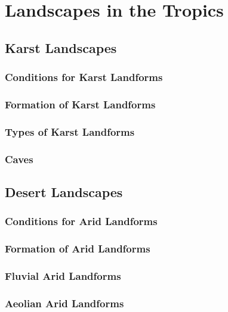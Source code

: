 \documentclass[../main]{subfiles}
\begin{document}
\section{Landscapes in the Tropics}

	\subsection{Karst Landscapes}

	\subsubsection{Conditions for Karst Landforms}

	\subsubsection{Formation of Karst Landforms}

	\subsubsection{Types of Karst Landforms}

	\subsubsection{Caves}

	\subsection{Desert Landscapes}

	\subsubsection{Conditions for Arid Landforms}

	\subsubsection{Formation of Arid Landforms}

	\subsubsection{Fluvial Arid Landforms}

	\subsubsection{Aeolian Arid Landforms}
\end{document}
